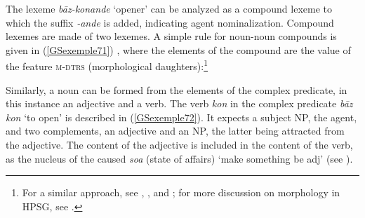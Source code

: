 {    \label{GSexemple70b}
\zl

The lexeme \emph{b\=az-konande} `opener' can be analyzed as a compound lexeme to which the suffix \emph{-ande} is added, indicating agent nominalization. Compound lexemes are made of two lexemes. A simple rule for noun-noun compounds is given in (\ref{GSexemple71}) \citep[178]{bonami2018lexeme}, where the elements of the compound are the value of the feature \textsc{m-dtrs} (morphological daughters):\footnote{For a similar approach, see \cite{Orgun96a}, \cite{Riehemann98a}, \cite{Koenig99a} and \cite{sag2003syntactic}; for more discussion on morphology in HPSG, see .}

\begin{exe}
\end{exe}

Similarly, a noun can be formed from the elements of the complex predicate, in this instance an adjective and a verb. The verb \emph{kon} in the complex predicate \emph{b\=az kon} `to open' is described in (\ref{GSexemple72}). It expects a subject NP, the agent, and two complements, an adjective and an NP, the latter being attracted from the adjective. The content of the adjective is included in the content of the verb, as the nucleus of the caused \emph{soa} (state of affairs) `make something be adj' (see \citealt[642]{MuellerPersian}).

}
